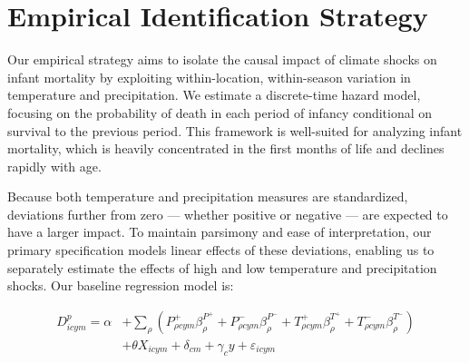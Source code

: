 \documentclass[a4paper]{article}
\begin{document}
\section{Empirical Identification Strategy} \label{sec:empiricalstrategy}

Our empirical strategy aims to isolate the causal impact of climate shocks on infant mortality by exploiting within-location, within-season variation in temperature and precipitation. We estimate a discrete-time hazard model, focusing on the probability of death in each period of infancy conditional on survival to the previous period. This framework is well-suited for analyzing infant mortality, which is heavily concentrated in the first months of life and declines rapidly with age.

Because both temperature and precipitation measures are standardized, deviations further from zero — whether positive or negative — are expected to have a larger impact. To maintain parsimony and ease of interpretation, our primary specification models linear effects of these deviations, enabling us to separately estimate the effects of high and low temperature and precipitation shocks. Our baseline regression model is:

\begin{equation}
\begin{split}
D_{icym}^p = \alpha &+ \sum_{\rho} \left( P^+_{\rho cym}\beta^{P^+}_{\rho} + P^-_{\rho cym}\beta^{P^-}_{\rho} + T^+_{\rho cym}\beta^{T^+}_{\rho} + T^-_{\rho cym}\beta^{T^-}_{\rho} \right) \\
&+ \theta X_{icym} + \delta_{cm} + \gamma_{c}y + \varepsilon_{icym}
\end{split}
\label{originalmodel}
\end{equation}
\end{document}
